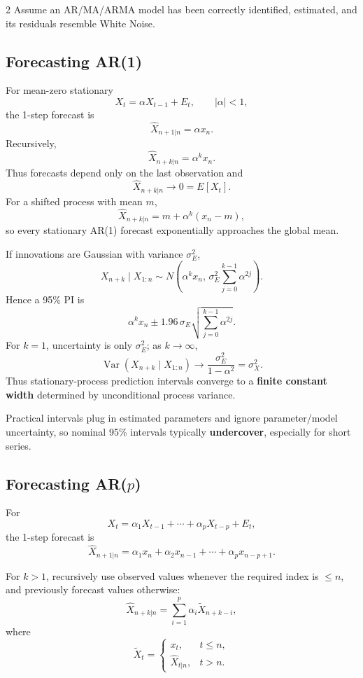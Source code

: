 \documentclass[9pt,a4paper]{extarticle}
\newcommand{\key}[1]{\textbf{#1}}
\begin{document}
\begin{multicols}{2}
Assume an AR/MA/ARMA model has been correctly identified, estimated, and its residuals resemble White Noise.

\subsection{Forecasting AR(1)}

For mean-zero stationary
\[
X_t=\alpha X_{t-1}+E_t,\qquad |\alpha|<1,
\]
the 1-step forecast is
\[
\boxed{\widehat X_{n+1|n}=\alpha x_n}.
\]
Recursively,
\[
\boxed{\widehat X_{n+k|n}=\alpha^k x_n}.
\]
Thus forecasts depend only on the last observation and
\[
\widehat X_{n+k|n}\to0=E[X_t].
\]
For a shifted process with mean \(m\),
\[
\boxed{\widehat X_{n+k|n}=m+\alpha^k(x_n-m)},
\]
so every stationary AR(1) forecast exponentially approaches the global mean.

If innovations are Gaussian with variance \(\sigma_E^2\),
\[
X_{n+k}\mid X_{1:n}\sim
N\!\left(
\alpha^kx_n,\,
\sigma_E^2\sum_{j=0}^{k-1}\alpha^{2j}
\right).
\]
Hence a 95\% PI is
\[
\boxed{
\alpha^kx_n\pm1.96\,\sigma_E
\sqrt{\sum_{j=0}^{k-1}\alpha^{2j}}
}.
\]
For \(k=1\), uncertainty is only \(\sigma_E^2\); as \(k\to\infty\),
\[
\operatorname{Var}(X_{n+k}\mid X_{1:n})
\to
\frac{\sigma_E^2}{1-\alpha^2}
=\sigma_X^2.
\]
Thus stationary-process prediction intervals converge to a \key{finite constant width} determined by unconditional process variance.

Practical intervals plug in estimated parameters and ignore parameter/model uncertainty, so nominal 95\% intervals typically \key{undercover}, especially for short series.

\subsection{Forecasting AR($p$)}

For
\[
X_t=\alpha_1X_{t-1}+\cdots+\alpha_pX_{t-p}+E_t,
\]
the 1-step forecast is
\[
\boxed{
\widehat X_{n+1|n}
=\alpha_1x_n+\alpha_2x_{n-1}+\cdots+\alpha_px_{n-p+1}.
}
\]

For \(k>1\), recursively use observed values whenever the required index is \(\le n\), and previously forecast values otherwise:
\[
\boxed{
\widehat X_{n+k|n}
=\sum_{i=1}^{p}\alpha_i
\widetilde X_{n+k-i},
}
\]
where
\[
\widetilde X_t=
\begin{cases}
x_t,&t\le n,\\
\widehat X_{t|n},&t>n.
\end{cases}
\]


\end{multicols}
\end{document}
